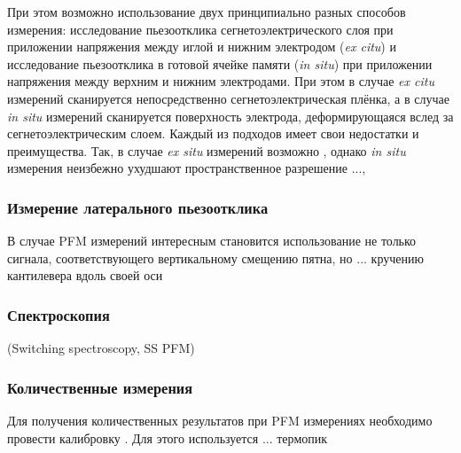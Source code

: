 При этом возможно использование двух принципиально разных способов измерения: исследование пьезоотклика сегнетоэлектрического слоя при приложении напряжения между иглой и нижним электродом (\textit{ex citu}) и исследование пьезоотклика в готовой ячейке памяти (\textit{in situ}) при приложении напряжения между верхним и нижним электродами. При этом в случае \textit{ex citu} измерений сканируется непосредственно сегнетоэлектрическая плёнка, а в случае \textit{in situ} измерений сканируется поверхность электрода, деформирующаяся вслед за сегнетоэлектрическим слоем. Каждый из подходов имеет свои недостатки и преимущества. Так, в случае \textit{ex situ} измерений возможно , однако \textit{in situ} измерения неизбежно ухудшают пространственное разрешение ...,


\subsubsection{Измерение латерального пьезоотклика}
В случае PFM измерений интересным становится использование не только сигнала, соответствующего вертикальному смещению пятна, но ... кручению кантилевера вдоль своей оси

\subsubsection{Спектроскопия}
(Switching spectroscopy, SS PFM)

\subsubsection{Количественные измерения}
Для получения количественных результатов при PFM измерениях необходимо провести калибровку . Для этого используется  ... термопик
